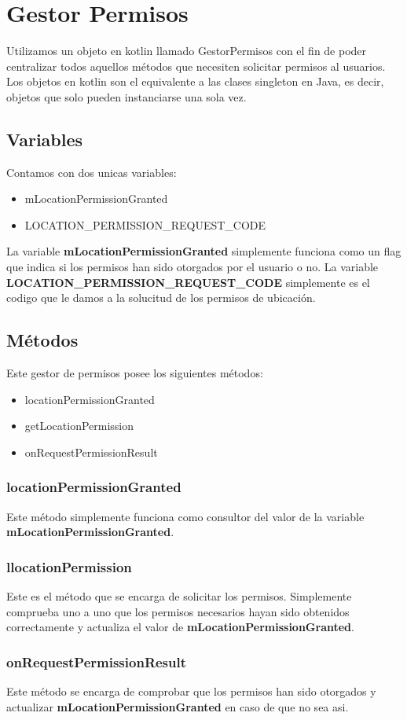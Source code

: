 \section{Gestor Permisos}
Utilizamos un objeto en kotlin llamado GestorPermisos con el fin de poder centralizar todos aquellos métodos que necesiten solicitar permisos al usuarios. Los objetos en kotlin son el equivalente a las clases singleton en Java, es decir, objetos que solo pueden instanciarse una sola vez.

\subsection{Variables}
Contamos con dos unicas variables:

\begin{itemize}
	\item mLocationPermissionGranted
	\item LOCATION\_PERMISSION\_REQUEST\_CODE
\end{itemize}

La variable \textbf{mLocationPermissionGranted} simplemente funciona como un flag que indica si los permisos han sido otorgados por el usuario o no. La variable \textbf{LOCATION\_PERMISSION\_REQUEST\_CODE} simplemente es el codigo que le damos a la solucitud de los permisos de ubicación.

\subsection{Métodos}

Este gestor de permisos posee los siguientes métodos:

\begin{itemize}
	\item locationPermissionGranted
	\item getLocationPermission
	\item onRequestPermissionResult
\end{itemize}


\subsubsection{locationPermissionGranted}
Este método simplemente funciona como consultor del valor de la variable \textbf{mLocationPermissionGranted}.

\subsubsection{llocationPermission}
Este es el método que se encarga de solicitar los permisos. Simplemente comprueba uno a uno que los permisos necesarios hayan sido obtenidos correctamente y actualiza el valor de \textbf{mLocationPermissionGranted}.

\subsubsection{onRequestPermissionResult}
Este método se encarga de comprobar que los permisos han sido otorgados y actualizar \textbf{mLocationPermissionGranted} en caso de que no sea asi.


